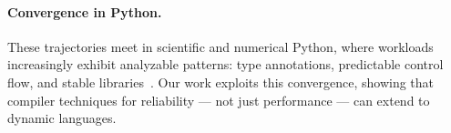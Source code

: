 \paragraph{Convergence in Python.}
These trajectories meet in scientific and numerical Python, where workloads increasingly exhibit analyzable patterns: type annotations, predictable control flow, and stable libraries~\cite{bence2021unambiguity,PEP484}. Our work exploits this convergence, showing that compiler techniques for reliability --- not just performance --- can extend to dynamic languages.
